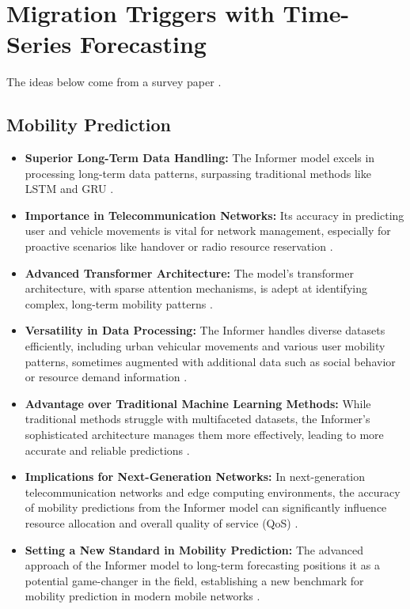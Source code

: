 \section{Migration Triggers with Time-Series Forecasting}

The ideas below come from a survey paper \cite{Toumi2023}.

\subsection{Mobility Prediction}


\begin{itemize}
    \item \textbf{Superior Long-Term Data Handling:} The Informer model excels in processing long-term data patterns, surpassing traditional methods like LSTM and GRU \cite{Zhang2020, Wu2019}.
    \item \textbf{Importance in Telecommunication Networks:} Its accuracy in predicting user and vehicle movements is vital for network management, especially for proactive scenarios like handover or radio resource reservation \cite{Haghshenas2022, Zhang2018}.
    \item \textbf{Advanced Transformer Architecture:} The model's transformer architecture, with sparse attention mechanisms, is adept at identifying complex, long-term mobility patterns \cite{Vaswani2017}.
    \item \textbf{Versatility in Data Processing:} The Informer handles diverse datasets efficiently, including urban vehicular movements and various user mobility patterns, sometimes augmented with additional data such as social behavior or resource demand information \cite{Kim2019, Nguyen2019}.
    \item \textbf{Advantage over Traditional Machine Learning Methods:} While traditional methods struggle with multifaceted datasets, the Informer's sophisticated architecture manages them more effectively, leading to more accurate and reliable predictions \cite{Li2020, Lin2018}.
    \item \textbf{Implications for Next-Generation Networks:} In next-generation telecommunication networks and edge computing environments, the accuracy of mobility predictions from the Informer model can significantly influence resource allocation and overall quality of service (QoS) \cite{Duggan2017, Park2020}.
    \item \textbf{Setting a New Standard in Mobility Prediction:} The advanced approach of the Informer model to long-term forecasting positions it as a potential game-changer in the field, establishing a new benchmark for mobility prediction in modern mobile networks \cite{Vaswani2017, Wu2019}.
\end{itemize}

